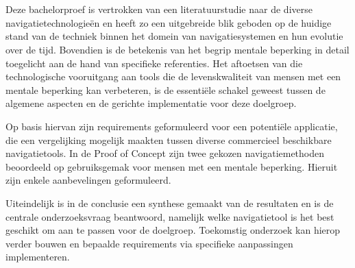 \section{}%
\label{sec:opzet-bachelorproef} 

Deze bachelorproef is vertrokken van een literatuurstudie naar de diverse navigatietechnologieën en heeft zo een uitgebreide blik geboden op de huidige stand van de techniek binnen het domein van navigatiesystemen en hun evolutie over de tijd. Bovendien is de betekenis van het begrip mentale beperking in detail toegelicht aan de hand van specifieke referenties. Het aftoetsen van die technologische vooruitgang aan tools die de levenskwaliteit van mensen met een mentale beperking kan verbeteren, is de essentiële schakel geweest tussen de algemene aspecten en de gerichte implementatie voor deze doelgroep.

Op basis hiervan zijn requirements geformuleerd voor een potentiële applicatie, die een vergelijking mogelijk maakten tussen diverse commercieel beschikbare navigatietools. In de Proof of Concept zijn twee gekozen navigatiemethoden beoordeeld op gebruiksgemak voor mensen met een mentale beperking. Hieruit zijn enkele aanbevelingen geformuleerd. 

Uiteindelijk is in de conclusie een synthese gemaakt van de resultaten en is de centrale onderzoeksvraag beantwoord, namelijk welke navigatietool is het best geschikt om aan te passen voor de doelgroep. Toekomstig onderzoek kan hierop verder bouwen en bepaalde requirements via specifieke aanpassingen implementeren.